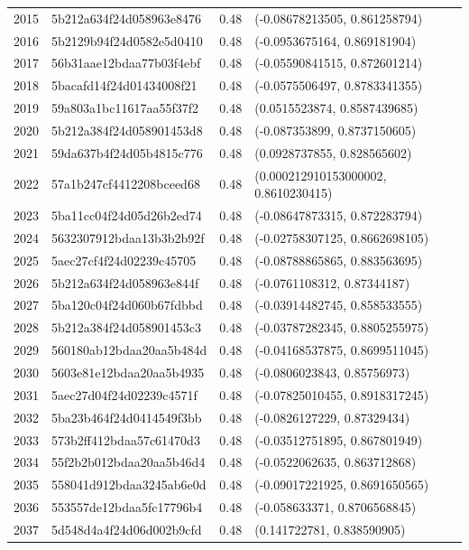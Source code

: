 \begin{table}[ht]
\begin{tabular}{rlrl}
  2015 & 5b212a634f24d058963e8476 & 0.48 & (-0.08678213505, 0.861258794) \\ 
  2016 & 5b2129b94f24d0582e5d0410 & 0.48 & (-0.0953675164, 0.869181904) \\ 
  2017 & 56b31aae12bdaa77b03f4ebf & 0.48 & (-0.05590841515, 0.872601214) \\ 
  2018 & 5bacafd14f24d01434008f21 & 0.48 & (-0.0575506497, 0.8783341355) \\ 
  2019 & 59a803a1bc11617aa55f37f2 & 0.48 & (0.0515523874, 0.8587439685) \\ 
  2020 & 5b212a384f24d058901453d8 & 0.48 & (-0.087353899, 0.8737150605) \\ 
  2021 & 59da637b4f24d05b4815c776 & 0.48 & (0.0928737855, 0.828565602) \\ 
  2022 & 57a1b247cf4412208bceed68 & 0.48 & (0.000212910153000002, 0.8610230415) \\ 
  2023 & 5ba11cc04f24d05d26b2ed74 & 0.48 & (-0.08647873315, 0.872283794) \\ 
  2024 & 5632307912bdaa13b3b2b92f & 0.48 & (-0.02758307125, 0.8662698105) \\ 
  2025 & 5aec27cf4f24d02239c45705 & 0.48 & (-0.08788865865, 0.883563695) \\ 
  2026 & 5b212a634f24d058963e844f & 0.48 & (-0.0761108312, 0.87344187) \\ 
  2027 & 5ba120c04f24d060b67fdbbd & 0.48 & (-0.03914482745, 0.858533555) \\ 
  2028 & 5b212a384f24d058901453c3 & 0.48 & (-0.03787282345, 0.8805255975) \\ 
  2029 & 560180ab12bdaa20aa5b484d & 0.48 & (-0.04168537875, 0.8699511045) \\ 
  2030 & 5603e81e12bdaa20aa5b4935 & 0.48 & (-0.0806023843, 0.85756973) \\ 
  2031 & 5aec27d04f24d02239c4571f & 0.48 & (-0.07825010455, 0.8918317245) \\ 
  2032 & 5ba23b464f24d0414549f3bb & 0.48 & (-0.0826127229, 0.87329434) \\ 
  2033 & 573b2ff412bdaa57c61470d3 & 0.48 & (-0.03512751895, 0.867801949) \\ 
  2034 & 55f2b2b012bdaa20aa5b46d4 & 0.48 & (-0.0522062635, 0.863712868) \\ 
  2035 & 558041d912bdaa3245ab6e0d & 0.48 & (-0.09017221925, 0.8691650565) \\ 
  2036 & 553557de12bdaa5fc17796b4 & 0.48 & (-0.058633371, 0.8706568845) \\ 
  2037 & 5d548d4a4f24d06d002b9cfd & 0.48 & (0.141722781, 0.838590905) \\ 

\end{tabular}
\end{table}
